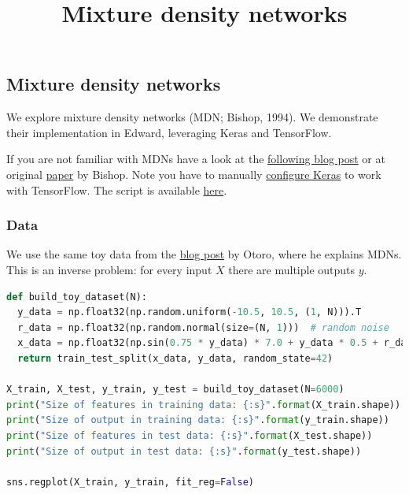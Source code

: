 \title{Mixture density networks}

\subsection{Mixture density networks}

We explore mixture density networks (MDN; Bishop, 1994). We
demonstrate their implementation in Edward, leveraging Keras and
TensorFlow.

If you are not familiar with MDNs have a look at the
\href{http://cbonnett.github.io/MDN.html}{following blog post} or at
original
\href{http://research.microsoft.com/en-us/um/people/cmbishop/downloads/Bishop-NCRG-94-004.pdf}{paper}
by Bishop.
Note you have to manually \href{https://keras.io/backend/}
{configure Keras} to work with TensorFlow.
The script is available
\href{https://github.com/blei-lab/edward/blob/master/examples/mixture_density_network_demo.py}
{here}.

\subsubsection{Data}

We use the same toy data from the \href{http://blog.otoro.net/2015/11/24/mixture-density-networks-with-tensorflow/}{blog post} by Otoro, where he explains MDNs. This is an inverse problem: for every input $X$ there are multiple outputs $y$.

\begin{lstlisting}[language=Python]
def build_toy_dataset(N):
  y_data = np.float32(np.random.uniform(-10.5, 10.5, (1, N))).T
  r_data = np.float32(np.random.normal(size=(N, 1)))  # random noise
  x_data = np.float32(np.sin(0.75 * y_data) * 7.0 + y_data * 0.5 + r_data * 1.0)
  return train_test_split(x_data, y_data, random_state=42)

X_train, X_test, y_train, y_test = build_toy_dataset(N=6000)
print("Size of features in training data: {:s}".format(X_train.shape))
print("Size of output in training data: {:s}".format(y_train.shape))
print("Size of features in test data: {:s}".format(X_test.shape))
print("Size of output in test data: {:s}".format(y_test.shape))

sns.regplot(X_train, y_train, fit_reg=False)
\end{lstlisting}


